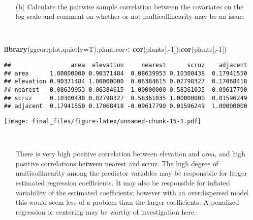 \documentclass[]{article}
\newenvironment{Shaded}{\begin{snugshade}}{\end{snugshade}}
\newcommand{\KeywordTok}[1]{\textcolor[rgb]{0.13,0.29,0.53}{\textbf{#1}}}
\newcommand{\DataTypeTok}[1]{\textcolor[rgb]{0.13,0.29,0.53}{#1}}
\newcommand{\DecValTok}[1]{\textcolor[rgb]{0.00,0.00,0.81}{#1}}
\newcommand{\StringTok}[1]{\textcolor[rgb]{0.31,0.60,0.02}{#1}}
\newcommand{\OperatorTok}[1]{\textcolor[rgb]{0.81,0.36,0.00}{\textbf{#1}}}
\newcommand{\NormalTok}[1]{#1}
\begin{document}
~

\begin{itemize}
\item[(b)] Calculate the pairwise sample correlation between the covariates on the log scale and comment on whether or not multicollinearity may be an issue.
\end{itemize}

~

\begin{Shaded}
\begin{Highlighting}[]
\KeywordTok{library}\NormalTok{(ggcorrplot,}\DataTypeTok{quietly=}\NormalTok{T);plant.cor<-}\KeywordTok{cor}\NormalTok{(plants[,}\OperatorTok{-}\DecValTok{1}\NormalTok{]);}\KeywordTok{cor}\NormalTok{(plants[,}\OperatorTok{-}\DecValTok{1}\NormalTok{])}
\end{Highlighting}
\end{Shaded}

\begin{verbatim}
##                 area  elevation     nearest      scruz    adjacent
## area      1.00000000 0.90371484  0.08639953 0.10300438  0.17941550
## elevation 0.90371484 1.00000000  0.06384615 0.02798327  0.17068418
## nearest   0.08639953 0.06384615  1.00000000 0.58361035 -0.09617790
## scruz     0.10300438 0.02798327  0.58361035 1.00000000  0.01596249
## adjacent  0.17941550 0.17068418 -0.09617790 0.01596249  1.00000000
\end{verbatim}

\begin{Shaded}
\end{Shaded}

\texttt{[image: final\_files/figure-latex/unnamed-chunk-15-1.pdf]}

~

\begin{itemize}
\item[] There is very high positive correlation between elevation and area, and high positive correlations between nearest and scruz. The high degree of multicollinearity among the predictor variables may be responsbile for larger estimated regression coefficients. It may also be responsible for inflated variability of the estimated coefficients; however with an overdispersed model this would seem less of a problem than the larger coefficients. A penalized regression or centering may be worthy of investigation here.
\end{itemize}
\end{document}
